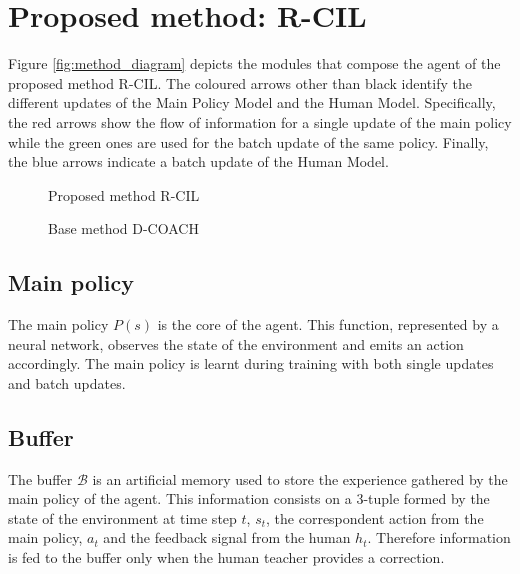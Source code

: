 \vspace{10mm} 


\section{Proposed method: R-CIL}
\label{section:Proposed method: R-CIL}

Figure \ref{fig:method_diagram} depicts the modules that compose the agent of the proposed method R-CIL. The coloured arrows other than black identify the different updates of the Main Policy Model and the Human Model. Specifically, the red arrows show the flow of information for a single update of the main policy while the green ones are used for the batch update of the same policy. Finally, the blue arrows indicate a batch update of the Human Model. 



\begin{figure}[H]
    \centering
    
    \caption{Proposed method R-CIL}
    \label{fig:RCIL_diagram}
\end{figure}


\begin{figure}[H]
    \centering
    
    \caption{Base method D-COACH}
    \label{fig:DCOACH_diagram}
\end{figure}

\subsection*{Main policy}

The main policy $P(s)$ is the core of the agent. This function, represented by a neural network, observes the state of the environment and emits an action accordingly. The main policy is learnt during training with both single updates and batch updates. 


\subsection*{Buffer}
The buffer $\mathcal{B}$ is an artificial memory  used to store the experience gathered by the main policy of the agent. This information consists on a 3-tuple formed by the state of the environment at time step $t$,  $s_t$, the correspondent action from the main policy, $a_t$ and the feedback signal from the human $h_t$. Therefore information is fed to the buffer only when the human teacher provides a correction.

